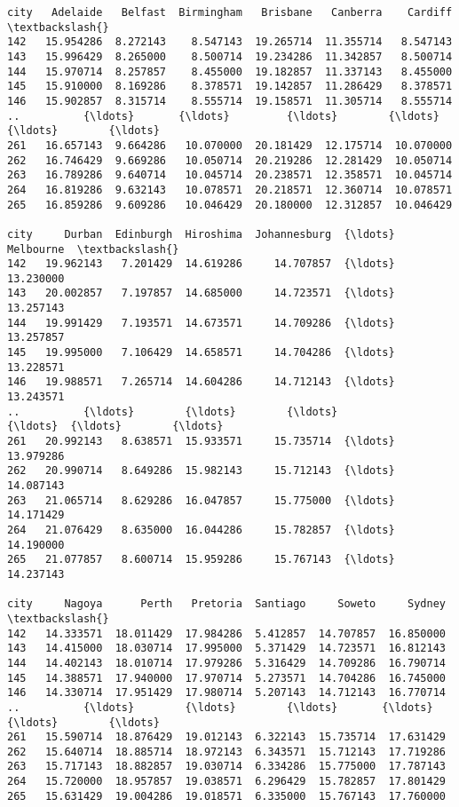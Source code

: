 \documentclass[11pt]{article}
\makeatletter
\newcommand{\boxspacing}{\kern\kvtcb@left@rule\kern\kvtcb@boxsep}
\newcommand{\prompt}[4]{
        {\ttfamily\llap{{\color{#2}[#3]:\hspace{3pt}#4}}\vspace{-\baselineskip}}
    }
\makeatother
\begin{document}
            \begin{tcolorbox}[breakable, size=fbox, boxrule=.5pt, pad at break*=1mm, opacityfill=0]
\prompt{Out}{outcolor}{132}{\boxspacing}
\begin{Verbatim}[commandchars=\\\{\}]
city   Adelaide   Belfast  Birmingham   Brisbane   Canberra    Cardiff  \textbackslash{}
142   15.954286  8.272143    8.547143  19.265714  11.355714   8.547143
143   15.996429  8.265000    8.500714  19.234286  11.342857   8.500714
144   15.970714  8.257857    8.455000  19.182857  11.337143   8.455000
145   15.910000  8.169286    8.378571  19.142857  11.286429   8.378571
146   15.902857  8.315714    8.555714  19.158571  11.305714   8.555714
..          {\ldots}       {\ldots}         {\ldots}        {\ldots}        {\ldots}        {\ldots}
261   16.657143  9.664286   10.070000  20.181429  12.175714  10.070000
262   16.746429  9.669286   10.050714  20.219286  12.281429  10.050714
263   16.789286  9.640714   10.045714  20.238571  12.358571  10.045714
264   16.819286  9.632143   10.078571  20.218571  12.360714  10.078571
265   16.859286  9.609286   10.046429  20.180000  12.312857  10.046429

city     Durban  Edinburgh  Hiroshima  Johannesburg  {\ldots}  Melbourne  \textbackslash{}
142   19.962143   7.201429  14.619286     14.707857  {\ldots}  13.230000
143   20.002857   7.197857  14.685000     14.723571  {\ldots}  13.257143
144   19.991429   7.193571  14.673571     14.709286  {\ldots}  13.257857
145   19.995000   7.106429  14.658571     14.704286  {\ldots}  13.228571
146   19.988571   7.265714  14.604286     14.712143  {\ldots}  13.243571
..          {\ldots}        {\ldots}        {\ldots}           {\ldots}  {\ldots}        {\ldots}
261   20.992143   8.638571  15.933571     15.735714  {\ldots}  13.979286
262   20.990714   8.649286  15.982143     15.712143  {\ldots}  14.087143
263   21.065714   8.629286  16.047857     15.775000  {\ldots}  14.171429
264   21.076429   8.635000  16.044286     15.782857  {\ldots}  14.190000
265   21.077857   8.600714  15.959286     15.767143  {\ldots}  14.237143

city     Nagoya      Perth   Pretoria  Santiago     Soweto     Sydney  \textbackslash{}
142   14.333571  18.011429  17.984286  5.412857  14.707857  16.850000
143   14.415000  18.030714  17.995000  5.371429  14.723571  16.812143
144   14.402143  18.010714  17.979286  5.316429  14.709286  16.790714
145   14.388571  17.940000  17.970714  5.273571  14.704286  16.745000
146   14.330714  17.951429  17.980714  5.207143  14.712143  16.770714
..          {\ldots}        {\ldots}        {\ldots}       {\ldots}        {\ldots}        {\ldots}
261   15.590714  18.876429  19.012143  6.322143  15.735714  17.631429
262   15.640714  18.885714  18.972143  6.343571  15.712143  17.719286
263   15.717143  18.882857  19.030714  6.334286  15.775000  17.787143
264   15.720000  18.957857  19.038571  6.296429  15.782857  17.801429
265   15.631429  19.004286  19.018571  6.335000  15.767143  17.760000


\end{Verbatim}
\end{tcolorbox}
\end{document}
